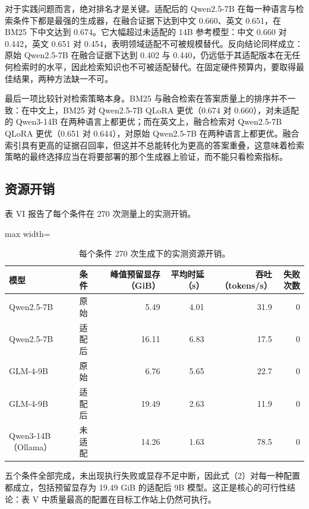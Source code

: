 \documentclass{article}
\begin{document}
对于实践问题而言，绝对排名才是关键。适配后的 Qwen2.5-7B 在每一种语言与检索条件下都是最强的生成器，在融合证据下达到中文 0.660、英文 0.651，在 BM25 下中文达到 0.674。它大幅超过未适配的 14B 参考模型：中文 0.660 对 0.442，英文 0.651 对 0.454，表明领域适配不可被规模替代。反向结论同样成立：原始 Qwen2.5-7B 在融合证据下达到 0.402 与 0.440，仍远低于其适配版本在无任何检索时的水平，因此检索知识也不可被适配替代。在固定硬件预算内，要取得最佳结果，两种方法缺一不可。

最后一项比较针对检索策略本身。BM25 与融合检索在答案质量上的排序并不一致：在中文上，BM25 对 Qwen2.5-7B QLoRA 更优（0.674 对 0.660），对未适配的 Qwen3-14B 在两种语言上都更优；而在英文上，融合检索对 Qwen2.5-7B QLoRA 更优（0.651 对 0.644），对原始 Qwen2.5-7B 在两种语言上都更优。融合索引具有更高的证据召回率，但这并不总能转化为更高的答案重叠，这意味着检索策略的最终选择应当在将要部署的那个生成器上验证，而不能只看检索指标。

\subsection{资源开销}

表 VI 报告了每个条件在 270 次测量上的实测开销。

\begin{table}[ht]
\centering
\caption{每个条件 270 次生成下的实测资源开销。}

\small
\begin{adjustbox}{max width=\linewidth}
\begin{tabular}{llrrrr}
\toprule
模型 & 条件 & 峰值预留显存（GiB） & 平均时延（s） & 吞吐（tokens/s） & 失败次数 \\
\midrule
Qwen2.5-7B & 原始 & 5.49 & 4.01 & 31.9 & 0 \\
Qwen2.5-7B & 适配后 & 16.11 & 6.83 & 17.5 & 0 \\
GLM-4-9B & 原始 & 6.76 & 5.65 & 22.7 & 0 \\
GLM-4-9B & 适配后 & 19.49 & 2.63 & 11.9 & 0 \\
Qwen3-14B（Ollama） & 未适配 & 14.26 & 1.63 & 78.5 & 0 \\
\bottomrule
\end{tabular}
\end{adjustbox}
\end{table}

五个条件全部完成，未出现执行失败或显存不足中断，因此式（2）对每一种配置都成立，包括预留显存为 19.49 GiB 的适配后 9B 模型。这正是核心的可行性结论：表 V 中质量最高的配置在目标工作站上仍然可执行。
\end{document}

